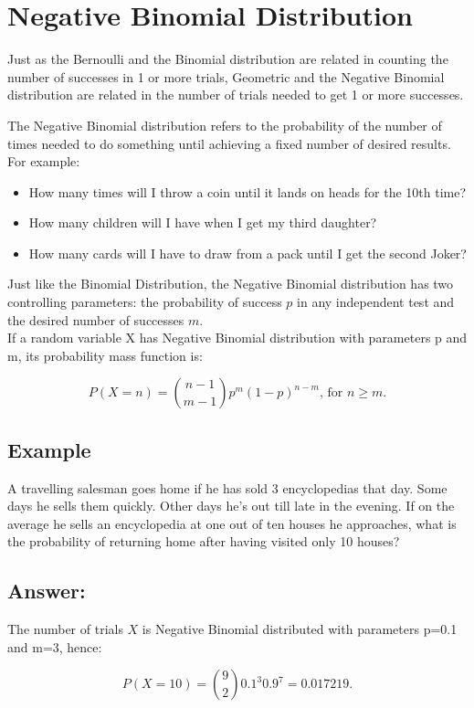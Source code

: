\documentclass[a4paper,12pt]{article}
\begin{document}
	\large
	\section*{Negative Binomial Distribution}
	Just as the Bernoulli and the Binomial distribution are related in counting the number of successes in 1 or more trials, 
	Geometric and the Negative Binomial distribution are related in the number of trials needed to get 1 or more successes.\\
	\medskip
	
	\noindent The Negative Binomial distribution refers to the probability of the number of times needed to do something until achieving a fixed number of desired results. For example:
	
	\begin{itemize}
		\item How many times will I throw a coin until it lands on heads for the 10th time?
		\item How many children will I have when I get my third daughter?
		\item How many cards will I have to draw from a pack until I get the second Joker?
	\end{itemize}
	
	\noindent Just like the Binomial Distribution, the Negative Binomial distribution has two controlling parameters: the probability of success $p$ in any independent test and the desired number of successes $m$. \\
	
	\noindent If a random variable X has Negative Binomial distribution with parameters p and m, its probability mass function is:
	
	\[P(X=n) = {n-1 \choose m-1} p^m (1-p)^{n-m} \mbox{, for } n \ge m.\]
	\subsection*{Example}
	A travelling salesman goes home if he has sold 3 encyclopedias that day. Some days he sells them quickly. Other days he's out till late in the evening. If on the average he sells an encyclopedia at one out of ten houses he approaches, what is the probability of returning home after having visited only 10 houses?
	
	\subsection*{Answer:}
	
	The number of trials $X$ is Negative Binomial distributed with parameters p=0.1 and m=3, hence:
	
	\[P(X=10) = {9 \choose 2} 0.1^3 0.9^7 = 0.017219.\]
	
\end{document}
